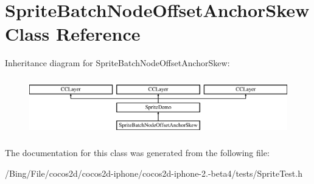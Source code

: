 \hypertarget{interface_sprite_batch_node_offset_anchor_skew}{\section{Sprite\-Batch\-Node\-Offset\-Anchor\-Skew Class Reference}
\label{interface_sprite_batch_node_offset_anchor_skew}
}
Inheritance diagram for Sprite\-Batch\-Node\-Offset\-Anchor\-Skew\-:\begin{figure}[H]
\begin{center}
\leavevmode
\includegraphics[height=2.533937cm]{interface_sprite_batch_node_offset_anchor_skew}
\end{center}
\end{figure}


The documentation for this class was generated from the following file\-:\begin{DoxyCompactItemize}
\item 
/\-Bing/\-File/cocos2d/cocos2d-\/iphone/cocos2d-\/iphone-\/2.-\/beta4/tests/Sprite\-Test.\-h\end{DoxyCompactItemize}

